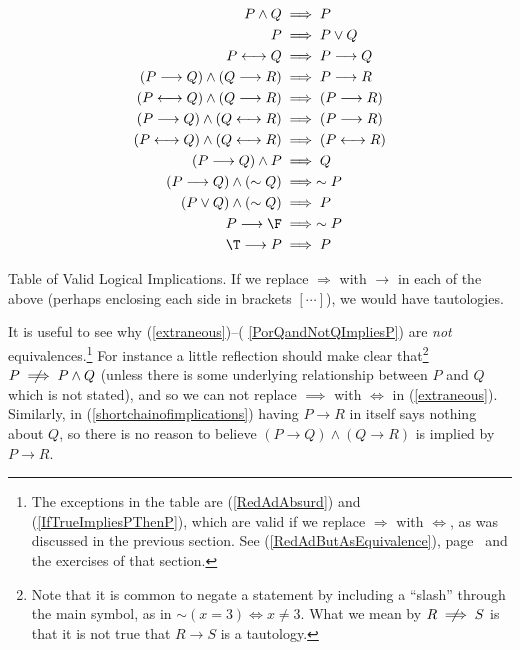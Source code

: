 \begin{table}
\begin{align}
P\wedge Q&\implies P\label{extraneous}\\
P&\implies P\vee Q\label{weaker->weakest}\\
P\longleftrightarrow Q
  &\implies P\longrightarrow Q\label{EquivImpliesImplication}\\
(P\longrightarrow Q)\wedge
  (Q\longrightarrow R)&\implies P\longrightarrow R
        \label{shortchainofimplications}\\
(P\longleftrightarrow Q)\wedge(Q\longrightarrow R)
  &\implies(P\longrightarrow R)\label{BiImp^Imp->Imp}\\
(P\longrightarrow Q)\wedge(Q\longleftrightarrow R)
    &\implies(P\longrightarrow R)\label{Imp^BiImpl->Imp}\\
(P\longleftrightarrow Q)\wedge(Q\longleftrightarrow R)
    &\implies(P\longleftrightarrow R)\label{ChainOfBiImplications}\\
(P\longrightarrow Q)\wedge P&\implies Q\label{(P>Q)^P>Q}\\
(P\longrightarrow Q)\wedge (\sim Q)&\implies\sim P
         \label{P>QandnotQ>notP}\\
(P\vee Q)\wedge(\sim Q)&\implies P \label{PorQandNotQImpliesP}\\
P\longrightarrow\F&\implies\sim P\label{RedAdAbsurd}\\
\T\longrightarrow P&\implies P\label{IfTrueImpliesPThenP}
\end{align}
\caption{Table of Valid Logical Implications.  If we replace
$\Longrightarrow$ with $\longrightarrow$ in each of the above
(perhaps enclosing each side in brackets $[\cdots]$), we would
have tautologies.}
\label{TableOfValidImplications}
\end{table}

It is useful to see why (\ref{extraneous})--(%
\ref{PorQandNotQImpliesP}) are {\it not} equivalences.\footnote{%
The exceptions
in the table are (\ref{RedAdAbsurd}) and (\ref{IfTrueImpliesPThenP}),
which are valid if
we replace $\Longrightarrow$ with $\Longleftrightarrow$,
as was discussed
in the previous section.
See (\ref{RedAdButAsEquivalence}),
page~\pageref{RedAdButAsEquivalence} and the exercises of that section.
}          
For instance a little reflection should make clear that\footnote{%
Note that it is common to negate a statement by including a
``slash'' through the main symbol, as in $\sim(x=3)\iff x\ne 3$.
What we mean by $R\,\,\,\,\not\!\!\!\!\implies  S$ is that 
it is not true that $R\longrightarrow S$ is a tautology.  
%
}
$P\,\,\,\,\not\!\!\!\!\implies P\wedge Q$ (unless there is some
underlying relationship between $P$ and $Q$
which is not stated), and so we can not replace
$\implies$ with $\iff$ in (\ref{extraneous}).
Similarly, in (\ref{shortchainofimplications})
having $P\longrightarrow R$ in itself says nothing about $Q$,
so there is no reason to believe 
$(P\longrightarrow Q)\wedge(Q\longrightarrow R)$
is implied by $P\longrightarrow R$.

